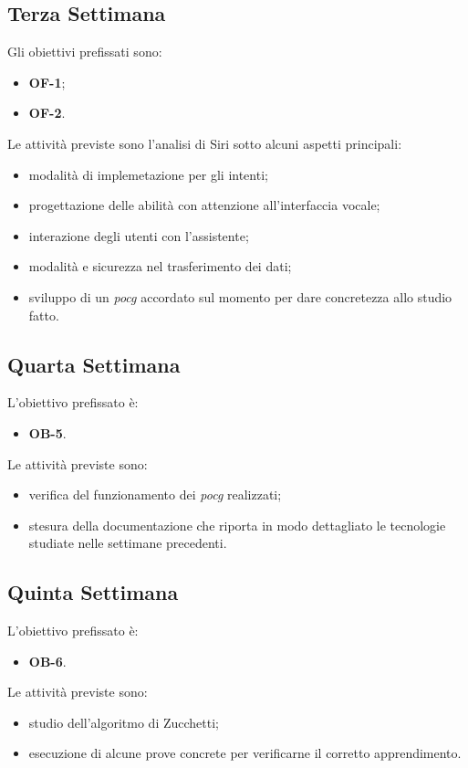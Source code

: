	\subsection*{Terza Settimana}
	Gli obiettivi prefissati sono:
	\begin{itemize}
		\item \textbf{OF-1};
		\item \textbf{OF-2}.
	\end{itemize}
	Le attività previste sono l'analisi di Siri sotto alcuni aspetti principali:
	\begin{itemize}
		\item modalità di implemetazione per gli intenti;
		\item progettazione delle abilità con attenzione all'interfaccia vocale;
		\item interazione degli utenti con l'assistente;
		\item modalità e sicurezza nel trasferimento dei dati;
		\item sviluppo di un \emph{\gls{pocg}} accordato sul momento per dare concretezza allo studio fatto.
	\end{itemize}
	\subsection*{Quarta Settimana}
	L'obiettivo prefissato è:
	\begin{itemize}
		\item \textbf{OB-5}.
	\end{itemize}
	Le attività previste sono:
	\begin{itemize}
		\item verifica del funzionamento dei \emph{\gls{pocg}} realizzati;
		\item stesura della documentazione che riporta in modo dettagliato le tecnologie studiate nelle settimane precedenti.
	\end{itemize}
	\subsection*{Quinta Settimana}
	L'obiettivo prefissato è:
	\begin{itemize}
		\item \textbf{OB-6}.
	\end{itemize}
	Le attività previste sono:
	\begin{itemize}
		\item studio dell'algoritmo di Zucchetti;
		\item esecuzione di alcune prove concrete per verificarne il corretto apprendimento.
	\end{itemize}
